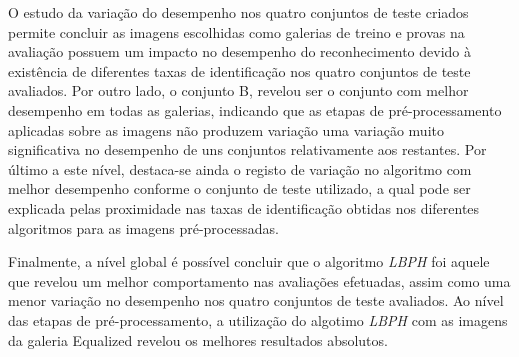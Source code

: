 O estudo da variação do desempenho nos quatro conjuntos de teste criados permite concluir as imagens escolhidas como galerias de treino e provas na avaliação possuem um impacto no desempenho do reconhecimento
devido à existência de diferentes taxas de identificação nos quatro conjuntos de teste avaliados. Por outro lado, o conjunto B, revelou ser o conjunto com melhor desempenho em todas as galerias, indicando que as etapas de pré-processamento aplicadas sobre as imagens não produzem variação uma variação muito significativa no desempenho de uns conjuntos relativamente aos restantes. Por último a este nível, destaca-se ainda o registo de variação no algoritmo com melhor desempenho conforme o conjunto de teste utilizado, a qual pode ser explicada pelas proximidade nas taxas de identificação obtidas nos diferentes algoritmos para as imagens pré-processadas. 

Finalmente, a nível global é possível concluir que o algoritmo \textit{LBPH} foi aquele que revelou um melhor comportamento nas avaliações efetuadas, assim como uma menor variação no desempenho nos quatro conjuntos de teste avaliados. Ao nível das etapas de pré-processamento, a utilização do algotimo \textit{LBPH} com as imagens da galeria Equalized revelou os melhores resultados absolutos.